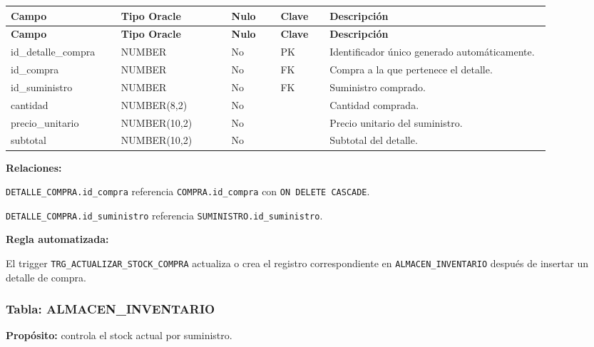 \begin{longtable}{p{0.18\linewidth}p{0.18\linewidth}p{0.08\linewidth}p{0.08\linewidth}p{0.36\linewidth}}
\toprule
\textbf{Campo} & \textbf{Tipo Oracle} & \textbf{Nulo} & \textbf{Clave} & \textbf{Descripción} \\
\midrule
\endfirsthead
\toprule
\textbf{Campo} & \textbf{Tipo Oracle} & \textbf{Nulo} & \textbf{Clave} & \textbf{Descripción} \\
\midrule
\endhead
id\_detalle\_compra & NUMBER & No & PK & Identificador único generado automáticamente. \\
id\_compra & NUMBER & No & FK & Compra a la que pertenece el detalle. \\
id\_suministro & NUMBER & No & FK & Suministro comprado. \\
cantidad & NUMBER(8,2) & No &  & Cantidad comprada. \\
precio\_unitario & NUMBER(10,2) & No &  & Precio unitario del suministro. \\
subtotal & NUMBER(10,2) & No &  & Subtotal del detalle. \\
\bottomrule
\end{longtable}

\textbf{Relaciones:}\par
\texttt{DETALLE\_COMPRA.id\_compra} referencia \texttt{COMPRA.id\_compra} con \texttt{ON DELETE CASCADE}.\par
\texttt{DETALLE\_COMPRA.id\_suministro} referencia \texttt{SUMINISTRO.id\_suministro}.\par

\textbf{Regla automatizada:}\par
El trigger \texttt{TRG\_ACTUALIZAR\_STOCK\_COMPRA} actualiza o crea el registro correspondiente en \texttt{ALMACEN\_INVENTARIO} después de insertar un detalle de compra.\par



\subsubsection{Tabla: ALMACEN\_INVENTARIO}

\textbf{Propósito:} controla el stock actual por suministro.\par

